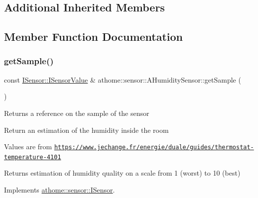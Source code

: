 \subsection*{Additional Inherited Members}


\subsection{Member Function Documentation}
\mbox{\label{classathome_1_1sensor_1_1_a_humidity_sensor_a7af4527c70b539bec58cecfaae0aa80e}} 
\subsubsection{\texorpdfstring{get\+Sample()}{getSample()}}
{\footnotesize\ttfamily const \mbox{\hyperlink{structathome_1_1sensor_1_1_i_sensor_1_1_i_sensor_value}{I\+Sensor\+::\+I\+Sensor\+Value}} \& athome\+::sensor\+::\+A\+Humidity\+Sensor\+::get\+Sample (\begin{DoxyParamCaption}{ }\end{DoxyParamCaption})\hspace{0.3cm}{\ttfamily [virtual]}}

Returns a reference on the sample of the sensor

Return an estimation of the humidity inside the room

Values are from \href{https://www.jechange.fr/energie/duale/guides/thermostat-temperature-4101}{\tt https\+://www.\+jechange.\+fr/energie/duale/guides/thermostat-\/temperature-\/4101} \begin{DoxyReturn}{Returns}
estimation of humidity quality on a scale from 1 (worst) to 10 (best) 
\end{DoxyReturn}


Implements \mbox{\hyperlink{classathome_1_1sensor_1_1_i_sensor_ae109cd3741ea9c88dc7e4f2eaf1485d5}{athome\+::sensor\+::\+I\+Sensor}}.

\mbox{\label{classathome_1_1sensor_1_1_a_humidity_sensor_a1eb32658be5cfc700523e74387e86053}} 
